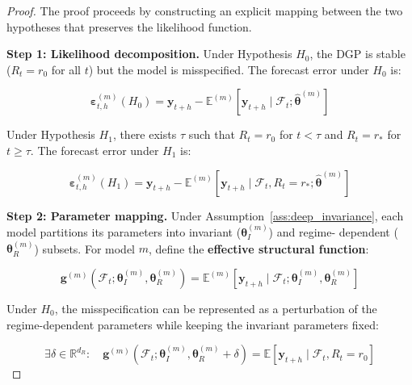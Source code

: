 \documentclass[12pt,a4paper]{article}
\begin{document}
\begin{proof}
The proof proceeds by constructing an explicit mapping between the
two hypotheses that preserves the likelihood function.

\medskip\noindent
\textbf{Step 1: Likelihood decomposition.}
Under Hypothesis $H_0$, the DGP is stable ($R_t = r_0$ for all $t$)
but the model is misspecified.  The forecast error under $H_0$ is:

\begin{equation}
    \boldsymbol{\varepsilon}_{t,h}^{(m)}(H_0) = \mathbf{y}_{t+h} -
    \mathbb{E}^{(m)}[\mathbf{y}_{t+h} \mid \mathcal{F}_t;
    \hat{\boldsymbol{\theta}}^{(m)}] \label{eq:fe_h0}
\end{equation}

Under Hypothesis $H_1$, there exists $\tau$ such that $R_t = r_0$ for
$t < \tau$ and $R_t = r_*$ for $t \geq \tau$.  The forecast error
under $H_1$ is:

\begin{equation}
    \boldsymbol{\varepsilon}_{t,h}^{(m)}(H_1) = \mathbf{y}_{t+h} -
    \mathbb{E}^{(m)}[\mathbf{y}_{t+h} \mid \mathcal{F}_t, R_t = r_*;
    \hat{\boldsymbol{\theta}}^{(m)}] \label{eq:fe_h1}
\end{equation}

\medskip\noindent
\textbf{Step 2: Parameter mapping.}
Under Assumption~\ref{ass:deep_invariance}, each model partitions its
parameters into invariant ($\boldsymbol{\theta}^{(m)}_I$) and regime-
dependent ($\boldsymbol{\theta}^{(m)}_R$) subsets.  For model $m$,
define the \textbf{effective structural function}:

\begin{equation}
    \mathbf{g}^{(m)}\left(\mathcal{F}_t; \boldsymbol{\theta}^{(m)}_I,
    \boldsymbol{\theta}^{(m)}_R\right) = \mathbb{E}^{(m)}\left[
    \mathbf{y}_{t+h} \mid \mathcal{F}_t; \boldsymbol{\theta}^{(m)}_I,
    \boldsymbol{\theta}^{(m)}_R\right] \label{eq:eff_structural}
\end{equation}

Under $H_0$, the misspecification can be represented as a perturbation
of the regime-dependent parameters while keeping the invariant
parameters fixed:

\begin{equation}
    \exists \delta \in \mathbb{R}^{d_R}: \quad
    \mathbf{g}^{(m)}\left(\mathcal{F}_t; \boldsymbol{\theta}^{(m)}_I,
    \boldsymbol{\theta}^{(m)}_R + \delta\right) =
    \mathbb{E}\left[\mathbf{y}_{t+h} \mid \mathcal{F}_t, R_t = r_0\right]
    \label{eq:misspec_map}
\end{equation}


\end{proof}
\end{document}
